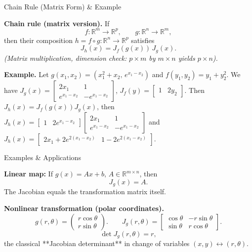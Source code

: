 \documentclass[aspectratio=169]{beamer}
\begin{document}
\begin{frame}{Chain Rule (Matrix Form) \& Example}

\textbf{Chain rule (matrix version).}
If
\[
f:\mathbb{R}^m \to \mathbb{R}^p, \qquad
g:\mathbb{R}^n \to \mathbb{R}^m,
\]
then their composition \(h=f\circ g:\mathbb{R}^n\to\mathbb{R}^p\) satisfies
\[
J_h(x)
= J_f(g(x))\, J_g(x).
\]
\textit{(Matrix multiplication, dimension check: \(p\times m\) by \(m\times n\) yields \(p\times n\)).}

\medskip

\textbf{Example.}
Let \(g(x_1,x_2)=(x_1^2+x_2,\, e^{x_1-x_2})\) and \(f(y_1,y_2)=y_1+y_2^2\). We have 
$
J_g(x)
=
\begin{bmatrix}
2x_1 & 1\\
e^{x_1-x_2} & -e^{x_1-x_2}
\end{bmatrix}$, $
J_f(y)
=
\begin{bmatrix}
1 & 2y_2
\end{bmatrix}$.
Then
$
J_h(x)
=J_f(g(x))J_g(x)$, then 
$
J_h(x)
=\begin{bmatrix}
1 & 2e^{x_1-x_2}
\end{bmatrix}
\begin{bmatrix}
2x_1 & 1\\
e^{x_1-x_2} & -e^{x_1-x_2}
\end{bmatrix}
$ and 
$
\boxed{J_h(x)
=\begin{bmatrix}
2x_1+2e^{2(x_1-x_2)} &
1-2e^{2(x_1-x_2)}
\end{bmatrix}.}
$

\end{frame}

\begin{frame}{Examples \& Applications}

\textbf{Linear map:}  
If \(g(x)=Ax+b\), \(A\in\mathbb{R}^{m\times n}\), then
\[
J_g(x)=A.
\]
The Jacobian equals the transformation matrix itself.

\medskip

\textbf{Nonlinear transformation (polar coordinates).}
\[
g(r,\theta)=
\begin{pmatrix}
r\cos\theta\\[2pt]
r\sin\theta
\end{pmatrix}.
\qquad
J_g(r,\theta)=
\begin{bmatrix}
\cos\theta & -r\sin\theta\\
\sin\theta & r\cos\theta
\end{bmatrix}.
\]
\[
\det J_g(r,\theta)=r,
\]
the classical **Jacobian determinant** in change of variables
\((x,y)\leftrightarrow(r,\theta)\).
\end{frame}
\end{document}
